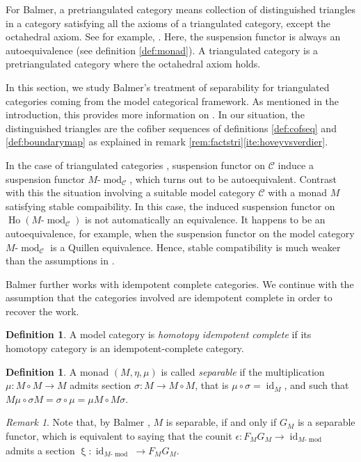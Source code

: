 \documentclass{article}
\newcommand{\cC}{\mathcal{C}}
\newcommand{\module}[2][]{#2\text{-}\modop_{#1}}
\DeclareMathOperator{\Ho}{Ho}
\DeclareMathOperator{\id}{id}
\DeclareMathOperator{\modop}{mod}
\theoremstyle{definition}
\newtheorem{definition}[theorem]{Definition}
\theoremstyle{remark}
\newtheorem{remark}[theorem]{Remark}
\begin{document}
For Balmer, a pretriangulated category means collection of distinguished triangles in a category satisfying all the axioms of
a triangulated category, except the octahedral axiom. See for example, \cite[Chapter 1, section 1.1]{neeman:trcat}. Here, the suspension functor
is always an autoequivalence (see definition \ref{def:monad}). A triangulated category \cite[definition 1.3.13 and proposition 1.4.6]{neeman:trcat} is a pretriangulated category where the octahedral axiom \cite[remark 1.4.7]{neeman:trcat} holds.

In this section, we study Balmer's treatment of separability for triangulated categories coming from the model categorical framework.
As mentioned in the introduction, this provides more information on \cite[remark 6.1]{balmer:septrcat}. In our situation, the distinguished triangles are the cofiber sequences of 
definitions \ref{def:cofseq} and \ref{def:boundarymap} as explained in remark \ref{rem:factstri}\eqref{ite:hoveyvsverdier}.
        
In the case of triangulated categories \cite{balmer:septrcat}, suspension functor on $\cC$ induce a suspension functor 
$\module[\cC]{M}$, which turns out to be autoequivalent. Contrast with this the situation involving a suitable model category $\cC$ with a monad $M$
satisfying stable compaibility. In this case, the induced suspension functor on $\Ho(\module[\cC]{M})$ is not automatically
an equivalence. It happens to be an autoequivalence, for example, when the suspension functor on the model category $\module[\cC]{M}$
is a Quillen equivalence. Hence, stable compatibility is much weaker than the assumptions in \cite{balmer:septrcat}.

Balmer further works with idempotent complete categories. We continue with the assumption that the categories
involved are idempotent complete in order to recover the work. 

\begin{definition}
    A model category is \emph{homotopy idempotent complete} if its homotopy category is an idempotent-complete category.
\end{definition}


\begin{definition}
    A monad $(M, \eta,\mu)$ is called \textit{separable} if the multiplication $\mu \colon M \circ M \rightarrow M$ admits section 
    $\sigma \colon M \rightarrow M \circ M$, that is $\mu \circ \sigma = \id_M$, and such that $M \mu \circ \sigma M = \sigma \circ \mu
    = \mu M \circ M \sigma$.
\end{definition}
\begin{remark}
  Note that, by Balmer \cite[section 3, \S\S 3.5 -- 3.11]{balmer:septrcat}, $M$ is separable, if and only if $G_M$ is a separable functor, which is equivalent to saying that the counit $\epsilon \colon F_{M}G_{M} \rightarrow \id_{\module{M}}$ admits a section $\upxi: \id_{\module{M}} \rightarrow F_{M}G_{M}$.
\end{remark}
\end{document}
